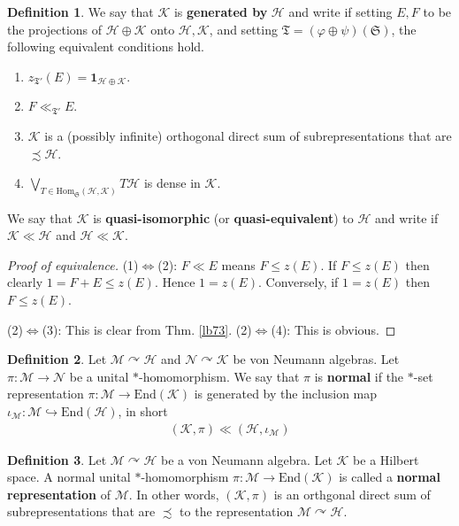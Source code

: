 \documentclass[12pt,b5paper,notitlepage]{article}
\theoremstyle{definition}
\newtheorem{df}{Definition}[section]
\theoremstyle{plain}
\newcommand{\fk}{\mathfrak}
\newcommand{\mc}{\mathcal}
\newcommand{\End}{\mathrm{End}} %
\newcommand{\idt}{\mathbf{1}}
\newcommand{\Hom}{\mathrm{Hom}}
\numberwithin{equation}{section}
\begin{document}
\begin{df}\label{lb100}
We say that $\mc K$ is \textbf{generated by} $\mc H$ and write \pmb{$\mc K\ll \mc H$} \index{KH@$\mc K\ll\mc H$} if setting $E,F$ to be the projections of $\mc H\oplus\mc K$ onto $\mc H,\mc K$, and setting $\fk T=(\varphi\oplus\psi)(\fk S)$, the following equivalent conditions hold.
\begin{enumerate}[label=(\arabic*)]
\item $z_{\fk T'}(E)=\idt_{\mc H\oplus\mc K}$.
\item $F\ll_{\fk T'}E$.
\item $\mc K$ is a (possibly infinite) orthogonal direct sum of subrepresentations that are $\precsim \mc H$.
\item $\bigvee_{T\in\Hom_{\fk S}(\mc H,\mc K)} T\mc H$ is dense in $\mc K$.
\end{enumerate}
We say that $\mc K$ is \textbf{quasi-isomorphic} (or \textbf{quasi-equivalent}) to $\mc H$ and write \pmb{$\mc K\sim\mc H$} if $\mc K\ll\mc H$ and $\mc H\ll\mc K$.
\end{df}

\begin{proof}[Proof of equivalence]
(1)$\Leftrightarrow$(2): $F\ll E$ means $F\leq z(E)$. If $F\leq z(E)$ then clearly $1=F+E\leq z(E)$. Hence $1=z(E)$. Conversely, if $1=z(E)$ then $F\leq z(E)$.

(2)$\Leftrightarrow$(3): This is clear from Thm. \ref{lb73}. (2)$\Leftrightarrow$(4): This is obvious.
\end{proof}




\begin{df}
Let $\mc M\curvearrowright\mc H$ and $\mc N\curvearrowright\mc K$ be von Neumann algebras. Let $\pi:\mc M\rightarrow\mc N$ be a unital $*$-homomorphism. We say that $\pi$ is  \textbf{normal} if the $*$-set representation $\pi:\mc M\rightarrow\End(\mc K)$ is generated by the inclusion map $\iota_{\mc M}:\mc M\hookrightarrow\End(\mc H)$, in short
\begin{align*}
(\mc K,\pi)\ll (\mc H,\iota_{\mc M})
\end{align*}
\end{df}

\begin{df}
Let $\mc M\curvearrowright\mc H$ be a von Neumann algebra. Let $\mc K$ be a Hilbert space. A normal unital $*$-homomorphism $\pi:\mc M\rightarrow\End(\mc K)$ is called a \textbf{normal representation} of $\mc M$. In other words, $(\mc K,\pi)$ is an orthgonal direct sum of subrepresentations that are $\precsim$ to the representation $\mc M\curvearrowright\mc H$.
\end{df}
\end{document}
